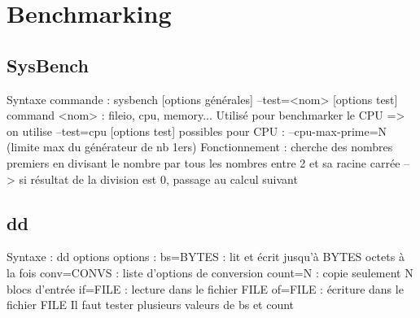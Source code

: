 \chapter{Benchmarking}

\section{SysBench}
Syntaxe commande : sysbench [options générales] --test=<nom> [options test] command
<nom> : fileio, cpu, memory...
Utilisé pour benchmarker le CPU => on utilise --test=cpu
[options test] possibles pour CPU : --cpu-max-prime=N (limite max du générateur de nb 1ers)
Fonctionnement : cherche des nombres premiers en divisant le nombre par tous les nombres entre 2 et sa racine carrée --> si résultat de la division est 0, passage au calcul suivant

\section{dd}
Syntaxe : dd options
options : 
	bs=BYTES : lit et écrit jusqu'à BYTES octets à la fois
	conv=CONVS : liste d'options de conversion
	count=N : copie seulement N blocs d'entrée
	if=FILE : lecture dans le fichier FILE
	of=FILE : écriture dans le fichier FILE
Il faut tester plusieurs valeurs de bs et count

